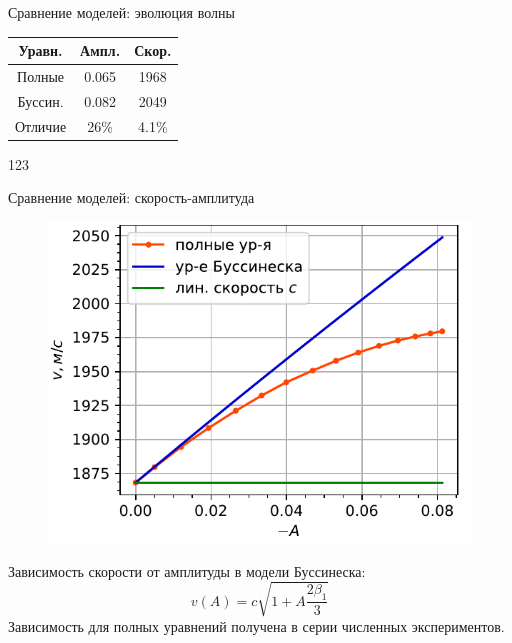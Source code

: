 \documentclass[usenames,dvipsnames]{beamer}
\begin{document}
\begin{frame}{Сравнение моделей: эволюция волны}
\vspace{2mm}
\begin{minipage}{\textwidth}
	\begin{minipage}[b]{0.6\textwidth}
	\end{minipage}
	\hfill
	\begin{minipage}[b]{0.39\textwidth}
		\centering
		\begin{tabular}{|c|c|c|}
			\hline 
			Уравн. & Ампл. & Скор. \\ 
			\hline 
			Полные & 0.065 & 1968 \\ 
			\hline 
			Буссин. & 0.082 & 2049 \\ 
			\hline 
			Отличие & 26\% & 4.1\% \\
			\hline
		\end{tabular}
		{\color{white}\vspace{2mm}123}
	\end{minipage}
\end{minipage}
\end{frame}


\begin{frame}{Сравнение моделей: скорость-амплитуда}
\begin{figure}
	\includegraphics[width=\linewidth]{Figures/VelAmplColor}
\end{figure}
Зависимость скорости от амплитуды в модели Буссинеска:
\begin{equation}\nonumber
v(A) = c\sqrt{1 + A\frac{2\beta_1}{3}}
\end{equation}
Зависимость для полных уравнений получена в серии численных экспериментов.\\
\end{frame}
\end{document}
